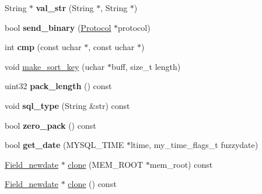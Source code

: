 \begin{DoxyCompactItemize}
\item 
\mbox{\label{classField__newdate_afa372b5934af77cbaafdf3e7199cea11}} 
String $\ast$ {\bfseries val\+\_\+str} (String $\ast$, String $\ast$)
\item 
\mbox{\label{classField__newdate_a0ec028903b4187e0c7eaec2a7117e5c9}} 
bool {\bfseries send\+\_\+binary} (\mbox{\hyperlink{classProtocol}{Protocol}} $\ast$protocol)
\item 
\mbox{\label{classField__newdate_a1910acfa7f6b8d3fcefb9123de478fe0}} 
int {\bfseries cmp} (const uchar $\ast$, const uchar $\ast$)
\item 
void \mbox{\hyperlink{classField__newdate_ab9ddf960c38a9d02e2eb3bda37b572e1}{make\+\_\+sort\+\_\+key}} (uchar $\ast$buff, size\+\_\+t length)
\item 
\mbox{\label{classField__newdate_ac06a95903cea5ee244b23d0e96b316e2}} 
uint32 {\bfseries pack\+\_\+length} () const
\item 
\mbox{\label{classField__newdate_ac15169d97e165c8d0ee52d26ac18bcc0}} 
void {\bfseries sql\+\_\+type} (String \&str) const
\item 
\mbox{\label{classField__newdate_a6fce9dfdf6c752127b588f8a20a523e8}} 
bool {\bfseries zero\+\_\+pack} () const
\item 
\mbox{\label{classField__newdate_a145e5026d830843a2c2258dc1561c160}} 
bool {\bfseries get\+\_\+date} (M\+Y\+S\+Q\+L\+\_\+\+T\+I\+ME $\ast$ltime, my\+\_\+time\+\_\+flags\+\_\+t fuzzydate)
\item 
\mbox{\hyperlink{classField__newdate}{Field\+\_\+newdate}} $\ast$ \mbox{\hyperlink{classField__newdate_a638bea89f424025554d5d173a5622eaf}{clone}} (M\+E\+M\+\_\+\+R\+O\+OT $\ast$mem\+\_\+root) const
\item 
\mbox{\hyperlink{classField__newdate}{Field\+\_\+newdate}} $\ast$ \mbox{\hyperlink{classField__newdate_a65ff3f5d3a9c0a8022159d88ccc911a4}{clone}} () const
\end{DoxyCompactItemize}
